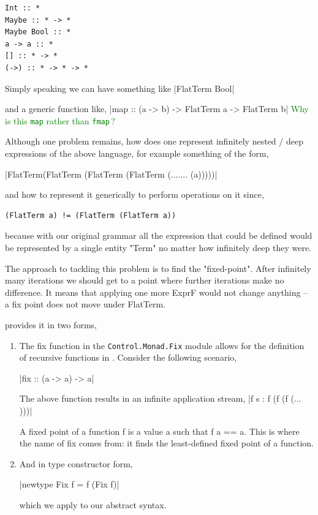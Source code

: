 \documentclass[thesis-solanki.tex]{subfiles}
\begin{document}
\begin{verbatim}
Int :: *
Maybe :: * -> *
Maybe Bool :: *
a -> a :: *
[] :: * -> *
(->) :: * -> * -> *
\end{verbatim}  

Simply speaking we can have something like 
|FlatTerm Bool|

and a generic function like,
|map :: (a -> b) -> FlatTerm a -> FlatTerm b|
\textcolor{green}{%
  Why is this {\color{blue}\Verb|map|} rather than {\color{blue}\Verb|fmap|}\,?
}

Although one problem remains, how does one represent infinitely nested / deep expressions of the above language, for example something of
the form,

|FlatTerm(FlatTerm (FlatTerm (FlatTerm (....... (a)))))|

and how to represent it generically to perform operations on it since,
\begin{verbatim}
(FlatTerm a) != (FlatTerm (FlatTerm a))
\end{verbatim}

because with our original grammar all the expression that could be defined would be represented by a single entity "Term" no matter how 
infinitely deep they were.

The approach to tackling this problem is to find the "fixed-point". After infinitely many iterations we should get to a  point where
further iterations make no difference. It means that applying one more ExprF would not change anything – a fix point does not move under 
FlatTerm. 

 provides it in two forms,
\begin{enumerate}

\item The fix function in the \texttt{Control.Monad.Fix} module allows for the definition of recursive functions in . Consider the following scenario,

|fix :: (a -> a) -> a|

The above function results in an infinite application stream,
|f s : f (f (f (... )))|

A fixed point of a function f is a value a such that f a == a. This is where the name of fix comes from: it finds the least-defined fixed 
point of a function.

\item And in type constructor form,

|newtype Fix f = f (Fix f)| 

which we apply to our abstract syntax.

\end{enumerate}
\end{document}

